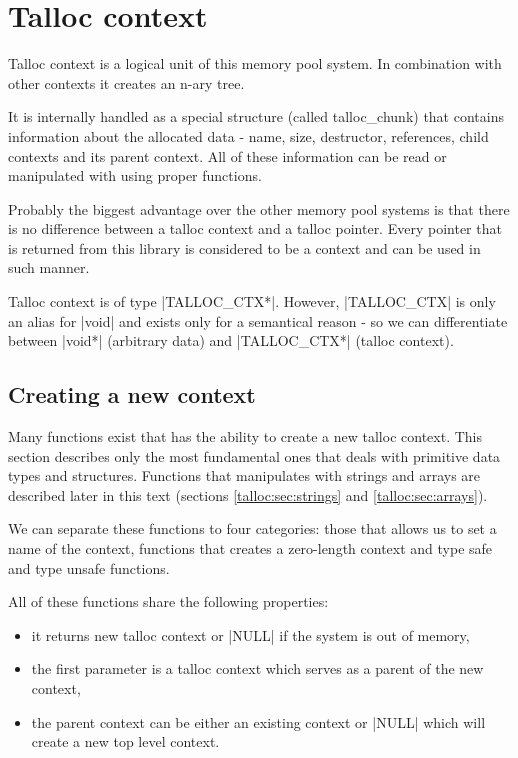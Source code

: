 \section{Talloc context}
\label{talloc:sec:context}

Talloc context is a logical unit of this memory pool system. In combination with
other contexts it creates an n-ary tree.

It is internally handled as a special structure (called talloc_chunk) that
contains information about the allocated data - name, size, destructor,
references, child contexts and its parent context. All of these information can
be read or manipulated with using proper functions.

Probably the biggest advantage over the other memory pool systems is that there
is no difference between a talloc context and a talloc pointer. Every pointer
that is returned from this library is considered to be a context and can be used
in such manner.

Talloc context is of type |TALLOC_CTX*|. However, |TALLOC_CTX| is only an alias
for |void| and exists only for a semantical reason - so we can differentiate
between |void*| (arbitrary data) and |TALLOC_CTX*| (talloc context).

\subsection{Creating a new context}
\label{talloc:subsec:new-context}

Many functions exist that has the ability to create a new talloc context. This
section describes only the most fundamental ones that deals with primitive data
types and structures. Functions that manipulates with strings and arrays are
described later in this text (sections \ref{talloc:sec:strings} and
\ref{talloc:sec:arrays}).

We can separate these functions to four categories: those that allows us to
set a name of the context, functions that creates a zero-length context and type
safe and type unsafe functions.

All of these functions share the following properties:
\begin{itemize}
  \item it returns new talloc context or |NULL| if the system is out of memory,
  \item the first parameter is a talloc context which serves as a parent of
  the new context,
  \item the parent context can be either an existing context or |NULL| which
  will create a new top level context.
\end{itemize}

